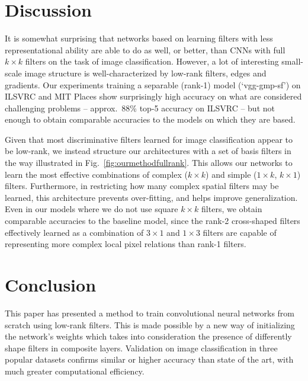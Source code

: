 \documentclass[thesis]{subfiles}
\begin{document}
    \section{Discussion}
    
    It is somewhat surprising that networks based on learning filters with less representational ability are able to do as well, or better, than CNNs with full $k\times k$ filters on the task of image classification. However, a lot of interesting small-scale image structure is well-characterized by low-rank filters, \eg edges and gradients. Our experiments training a separable (rank-1) model (`vgg-gmp-sf') on ILSVRC and MIT Places show surprisingly high accuracy on what are considered challenging problems -- approx.\ 88\% top-5 accuracy on ILSVRC -- but not enough to obtain comparable accuracies to the models on which they are based.
    
    Given that most discriminative filters learned for image classification appear to be low-rank, we instead structure our architectures with a set of basis filters in the way illustrated in Fig.~\ref{fig:ourmethodfullrank}. This allows our networks to learn the most effective combinations of complex (\eg $k\times k$) and simple (\eg $1\times k$, $k\times 1$) filters. Furthermore, in restricting how many complex spatial filters may be learned, this architecture prevents over-fitting, and helps improve generalization. Even in our models where we do not use square $k\times k$ filters, we obtain comparable accuracies to the baseline model, since the rank-2 cross-shaped filters effectively learned as a combination of $3 \times 1$ and $1 \times 3$ filters are capable of representing more complex local pixel relations than rank-1 filters.
    
    \section{Conclusion}
    This paper has presented a method to train convolutional neural networks from scratch using low-rank filters. This is made possible by a new way of initializing the network’s weights which takes into consideration the presence of differently shape filters in composite layers. 
    Validation on image classification in three popular datasets confirms similar or higher accuracy than state of the art, with much greater computational efficiency. 
    
\end{document}
